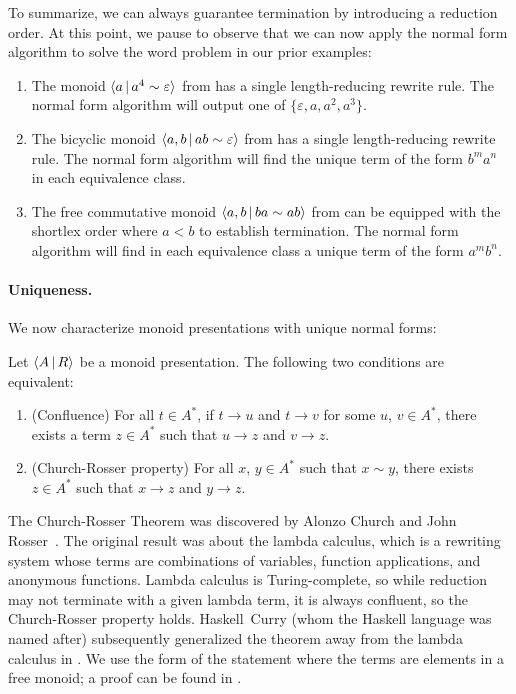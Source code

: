 \documentclass[../generics]{subfiles}
\begin{document}
To summarize, we can always guarantee termination by introducing a reduction order. At this point, we pause to observe that we can now apply the normal form algorithm to solve the word problem in our prior examples:
\begin{enumerate}
\item The monoid $\langle a\,|\,a^4\sim\varepsilon\rangle$ from  has a single length-reducing rewrite rule. The normal form algorithm will output one of $\{\varepsilon,a,a^2,a^3\}$.
\item The bicyclic monoid $\langle a, b\,|\,ab\sim\varepsilon\rangle$ from  has a single length-reducing rewrite rule. The normal form algorithm will find the unique term of the form $b^m a^n$ in each equivalence class.
\item The free commutative monoid $\langle a,b\,|\,ba\sim ab\rangle$ from  can be equipped with the shortlex order where $a<b$ to establish termination. The normal form algorithm will find in each equivalence class a unique term of the form $a^m b^n$.
\end{enumerate}

\paragraph{Uniqueness.}
We now characterize monoid presentations with unique normal forms:

\begin{theorem}\label{church rosser theorem}
Let $\langle A\,|\,R\rangle$ be a monoid presentation. The following two conditions are equivalent:
\begin{enumerate}
\item {}(Confluence) For all $t\in A^*$, if $t\rightarrow u$ and $t\rightarrow v$ for some $u$, $v\in A^*$, there exists a term $z\in A^*$ such that $u\rightarrow z$ and $v\rightarrow z$.
\item {}(Church-Rosser property) For all $x$, $y\in A^*$ such that $x\sim y$, there exists $z\in A^*$ such that $x\rightarrow z$ and $y\rightarrow z$.
\end{enumerate}
\end{theorem}

The Church-Rosser Theorem was discovered by Alonzo Church and John Rosser~\cite{conversion}. The original result was about the lambda calculus, which is a rewriting system whose terms are combinations of variables, function applications, and anonymous functions. Lambda calculus is Turing-complete, so while reduction may not terminate with a given lambda term, it is always confluent, so the Church-Rosser property holds. Haskell~Curry (whom the Haskell language was named after) subsequently generalized the theorem away from the lambda calculus in \cite{combinatory}. We use the form of the statement where the terms are elements in a free monoid; a proof can be found in \cite{book2012string}.
\end{document}
